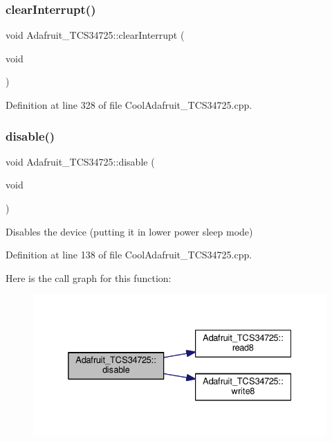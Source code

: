 \subsubsection{\texorpdfstring{clear\+Interrupt()}{clearInterrupt()}}
{\footnotesize\ttfamily void Adafruit\+\_\+\+T\+C\+S34725\+::clear\+Interrupt (\begin{DoxyParamCaption}\item[{void}]{ }\end{DoxyParamCaption})}



Definition at line 328 of file Cool\+Adafruit\+\_\+\+T\+C\+S34725.\+cpp.

\mbox{\label{class_adafruit___t_c_s34725_a79ac9b01a540f132d4bbf2edd2d6e8a2}} 
\subsubsection{\texorpdfstring{disable()}{disable()}}
{\footnotesize\ttfamily void Adafruit\+\_\+\+T\+C\+S34725\+::disable (\begin{DoxyParamCaption}\item[{void}]{ }\end{DoxyParamCaption})\hspace{0.3cm}{\ttfamily [private]}}

Disables the device (putting it in lower power sleep mode) 

Definition at line 138 of file Cool\+Adafruit\+\_\+\+T\+C\+S34725.\+cpp.

Here is the call graph for this function\+:
\nopagebreak
\begin{figure}[H]
\begin{center}
\leavevmode
\includegraphics[width=332pt]{class_adafruit___t_c_s34725_a79ac9b01a540f132d4bbf2edd2d6e8a2_cgraph}
\end{center}
\end{figure}
\mbox{\label{class_adafruit___t_c_s34725_ad9a0e1f4f77d32dc0a6d604f7d1d5586}} 

